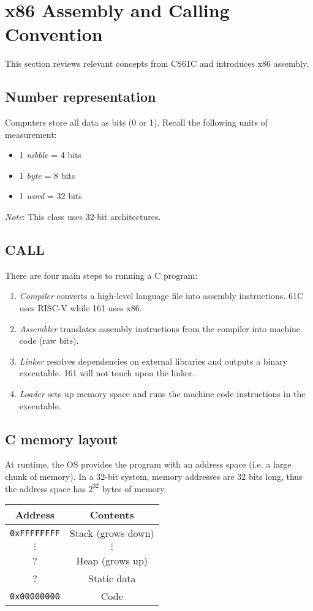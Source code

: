 \chapter{x86 Assembly and Calling Convention}

This section reviews relevant concepts from CS61C and introduces x86 assembly.

\section{Number representation}
Computers store all data as bits (0 or 1). Recall the following units of measurement:
\begin{itemize}
    \item 1 \emph{nibble} = 4 bits
    \item 1 \emph{byte} = 8 bits
    \item 1 \emph{word} = 32 bits
\end{itemize}
\emph{Note}: This class uses 32-bit architectures.

\section{CALL}
There are four main steps to running a C program:
\begin{enumerate}
    \item \emph{Compiler} converts a high-level language file into assembly instructions. 61C uses RISC-V while 161 uses x86.
    \item \emph{Assembler} translates assembly instructions from the compiler into machine code (raw bits).
    \item \emph{Linker} resolves dependencies on external libraries and outputs a binary executable. 161 will not touch upon the linker.
    \item \emph{Loader} sets up memory space and runs the machine code instructions in the executable.
\end{enumerate}

\section{C memory layout}
At runtime, the OS provides the program with an address space (i.e. a large chunk of memory). In a 32-bit system, memory addresses are 32 bits long, thus the address space has \(2^{32}\) bytes of memory.

\bigskip
\begin{tabular}{|c|c|}
    \hline
	Address & Contents\\ \hline
	\texttt{0xFFFFFFFF} & Stack (grows down)\\ \hline
	\(\vdots\) & \(\vdots\) \\ \hline
	? & Heap (grows up) \\ \hline
	? & Static data \\ \hline
	\texttt{0x00000000} & Code \\
	\hline
\end{tabular}

